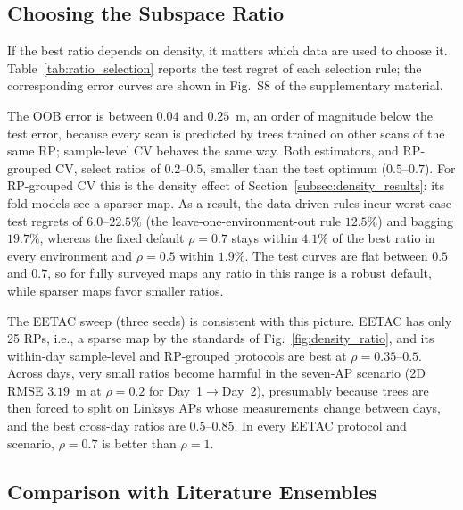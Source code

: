 \subsection{Choosing the Subspace Ratio}
\label{subsec:selection_results}

If the best ratio depends on density, it matters which data are used to choose it. Table~\ref{tab:ratio_selection} reports the test regret of each selection rule; the corresponding error curves are shown in Fig.~S8 of the supplementary material.



The OOB error is between $0.04$ and $0.25$~m, an order of magnitude below the test error, because every scan is predicted by trees trained on other scans of the same RP; sample-level CV behaves the same way. Both estimators, and RP-grouped CV, select ratios of $0.2$--$0.5$, smaller than the test optimum ($0.5$--$0.7$). For RP-grouped CV this is the density effect of Section~\ref{subsec:density_results}: its fold models see a sparser map. As a result, the data-driven rules incur worst-case test regrets of $6.0$--$22.5\%$ (the leave-one-environment-out rule $12.5\%$) and bagging $19.7\%$, whereas the fixed default $\rho=0.7$ stays within $4.1\%$ of the best ratio in every environment and $\rho=0.5$ within $1.9\%$. The test curves are flat between $0.5$ and $0.7$, so for fully surveyed maps any ratio in this range is a robust default, while sparser maps favor smaller ratios.

The EETAC sweep (three seeds) is consistent with this picture. EETAC has only 25 RPs, i.e., a sparse map by the standards of Fig.~\ref{fig:density_ratio}, and its within-day sample-level and RP-grouped protocols are best at $\rho=0.35$--$0.5$. Across days, very small ratios become harmful in the seven-AP scenario (2D RMSE $3.19$~m at $\rho=0.2$ for Day~1$\rightarrow$Day~2), presumably because trees are then forced to split on Linksys APs whose measurements change between days, and the best cross-day ratios are $0.5$--$0.85$. In every EETAC protocol and scenario, $\rho=0.7$ is better than $\rho=1$.

\subsection{Comparison with Literature Ensembles}
\label{subsec:literature_results}

